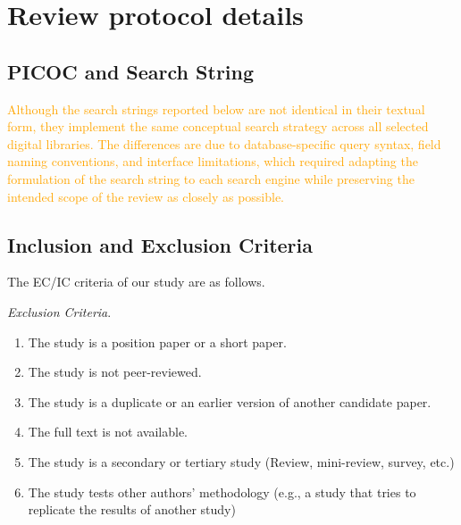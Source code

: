 \appendix
\section{Review protocol details}
\label{Appendix}


\subsection{PICOC and Search String}
\label{subsec:Appendix-PICOC-and-Search-String}
\textcolor{orange}{Although the search strings reported below are not identical in their textual form, they implement the same conceptual search strategy across all selected digital libraries. The differences are due to database-specific query syntax, field naming conventions, and interface limitations, which required adapting the formulation of the search string to each search engine while preserving the intended scope of the review as closely as possible.}




\subsection{Inclusion and Exclusion Criteria}
\label{subsec:Appendix-IC-EC}
The EC/IC criteria of our study are as follows.

\textit{Exclusion Criteria}.
\begin{enumerate}[label=(EC\arabic*), leftmargin=19.5mm, itemsep=1pt, parsep=0pt]
    \item The study is a position paper or a short paper.
    \item The study is not peer-reviewed.
    \item The study is a duplicate or an earlier version of another candidate paper.
    \item The full text is not available.
    \item The study is a secondary or tertiary study (Review, mini-review, survey, etc.) 
    \item The study tests other authors' methodology (e.g., a study that tries to replicate the results of another study)
\end{enumerate}

